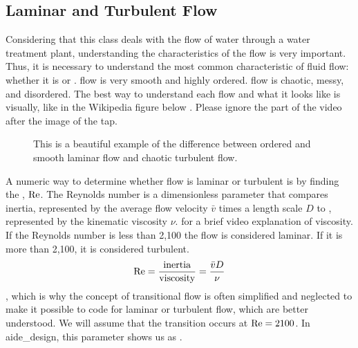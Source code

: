 \documentclass[letterpaper,10pt,english]{sphinxmanual}
\let\sphinxpxdimen\pdfpxdimen\else\newdimen\sphinxpxdimen
\begin{document}
\subsection{Laminar and Turbulent Flow}
\label{\detokenize{Review/Review_Fluid_Mechanics:laminar-and-turbulent-flow}}\label{\detokenize{Review/Review_Fluid_Mechanics:heading-laminar-and-turbulent-flow}}
Considering that this class deals with the flow of water through a water treatment plant, understanding the characteristics of the flow is very important. Thus, it is necessary to understand the most common characteristic of fluid flow: whether it is  or .  flow is very smooth and highly ordered.  flow is chaotic, messy, and disordered. The best way to understand each flow and what it looks like is visually, like in the Wikipedia figure below . Please ignore the part of the video after the image of the tap.

\begin{figure}[htbp]
\centering
\capstart

\noindent\sphinxincludegraphics[width=400\sphinxpxdimen]{{Wikipedia_laminar_turbulent}.png}
\caption{This is a beautiful example of the difference between ordered and smooth laminar flow and chaotic turbulent flow.}\label{\detokenize{Review/Review_Fluid_Mechanics:id2}}\label{\detokenize{Review/Review_Fluid_Mechanics:figure-wikipedia-laminar-turbulent}}\end{figure}

A numeric way to determine whether flow is laminar or turbulent is by finding the , \({\rm Re}\). The Reynolds number is a dimensionless parameter that compares inertia, represented by the average flow velocity \(\bar v\) times a length scale \(D\) to , represented by the kinematic viscosity \(\nu\).  for a brief video explanation of viscosity. If the Reynolds number is less than 2,100 the flow is considered laminar. If it is more than 2,100, it is considered turbulent.
\begin{equation}\label{equation:Review/Review_Fluid_Mechanics:Review/Review_Fluid_Mechanics:3}
\begin{split}{\rm Re = \frac{inertia}{viscosity}} = \frac{\bar vD}{\nu}\end{split}
\end{equation}
, which is why the concept of transitional flow is often simplified and neglected to make it possible to code for laminar or turbulent flow, which are better understood. We will assume that the transition occurs at \(\rm{Re} = 2100\). In aide\_design, this parameter shows us as .
\end{document}
